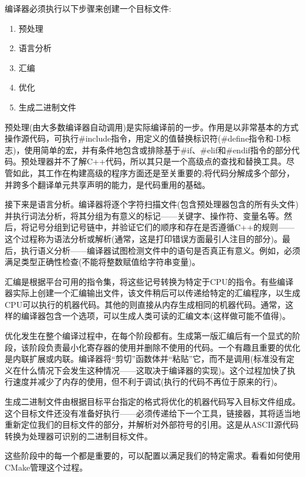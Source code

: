 编译器必须执行以下步骤来创建一个目标文件:

\begin{enumerate}
\item 
预处理

\item 
语言分析

\item 
汇编

\item 
优化

\item 
生成二进制文件
\end{enumerate}

预处理(由大多数编译器自动调用)是实际编译前的一步。作用是以非常基本的方式操作源代码，可执行\#include指令，用定义的值替换标识符(\#define指令和-D标志)，使用简单的宏，并有条件地包含或排除基于\#if、\#elif和\#endif指令的部分代码。预处理器并不了解C++代码，所以其只是一个高级点的查找和替换工具。尽管如此，其工作在构建高级的程序方面还是至关重要的;将代码分解成多个部分，并跨多个翻译单元共享声明的能力，是代码重用的基础。

接下来是语言分析。编译器将逐个字符扫描文件(包含预处理器包含的所有头文件)并执行词法分析，将其分组为有意义的标记——关键字、操作符、变量名等。然后，将记号分组到记号链中，并验证它们的顺序和存在是否遵循C++的规则——这个过程称为语法分析或解析(通常，这是打印错误方面最引人注目的部分)。最后，执行语义分析——编译器试图检测文件中的语句是否真正有意义。例如，必须满足类型正确性检查(不能将整数赋值给字符串变量)。

汇编是根据平台可用的指令集，将这些记号转换为特定于CPU的指令。有些编译器实际上创建一个汇编输出文件，该文件稍后可以传递给特定的汇编程序，以生成CPU可以执行的机器代码。其他的则直接从内存生成相同的机器代码。通常，这样的编译器包含一个选项，可以生成人类可读的汇编文本(这样做可能不值得)。

优化发生在整个编译过程中，在每个阶段都有。生成第一版汇编后有一个显式的阶段，该阶段负责最小化寄存器的使用并删除不使用的代码。一个有趣且重要的优化是内联扩展或内联。编译器将“剪切”函数体并“粘贴”它，而不是调用(标准没有定义在什么情况下会发生这种情况——这取决于编译器的实现)。这个过程加快了执行速度并减少了内存的使用，但不利于调试(执行的代码不再位于原来的行)。

生成二进制文件由根据目标平台指定的格式将优化的机器代码写入目标文件组成。这个目标文件还没有准备好执行——必须传递给下一个工具，链接器，其将适当地重新定位我们的目标文件的部分，并解析对外部符号的引用。这是从ASCII源代码转换为处理器可识别的二进制目标文件。

这些阶段中的每一个都是重要的，可以配置以满足我们的特定需求。看看如何使用CMake管理这个过程。

